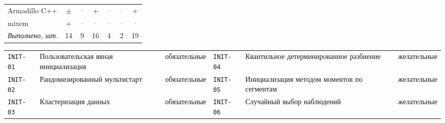 \documentclass[10pt,a4paper]{article}
\begin{document}
\begin{landscape}
{\begin{longtable}{@{}l *{6}{c}@{}}
Armadillo C++ & \cellcolor{part!45}$\pm$ & \textcolor{gray}{·} & \cellcolor{yes!35}+ & \textcolor{gray}{·} & \textcolor{gray}{·} & \cellcolor{yes!35}+ \\
mixem & \cellcolor{yes!35}+ & \textcolor{gray}{·} & \textcolor{gray}{·} & \textcolor{gray}{·} & \textcolor{gray}{·} & \textcolor{gray}{·} \\
\midrule \textit{Выполнено, шт.} & 14 & 9 & 16 & 4 & 2 & 19 \\
\bottomrule
\end{longtable}}
{\scriptsize\setlength{\tabcolsep}{3pt}
\begin{tabular}{@{}l >{\raggedright\arraybackslash}p{7.4cm} l l >{\raggedright\arraybackslash}p{7.4cm} l@{}}
\texttt{INIT-01} & Пользовательская явная инициализация & обязательные & \texttt{INIT-04} & Квантильное детерминированное разбиение & желательные \\
\texttt{INIT-02} & Рандомизированный мультистарт & обязательные & \texttt{INIT-05} & Инициализация методом моментов по сегментам & желательные \\
\texttt{INIT-03} & Кластеризация данных & обязательные & \texttt{INIT-06} & Случайный выбор наблюдений & желательные \\
\end{tabular}}


\end{landscape}
\end{document}
